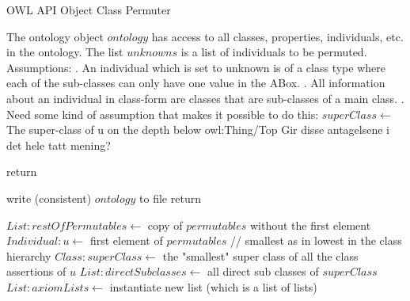 \documentclass{article}
\begin{document}





\begin{algorithm}
\caption{OWL API Object Class Permuter}
\begin{algorithmic}[0]

\State The ontology object $ontology$ has access to all classes, properties, individuals, etc. in the ontology.
\State The list $unknowns$ is a list of individuals to be permuted.
\State
\State Assumptions:
. An individual which is set to unknown is of a class type where each of the sub-classes can only have one value in the ABox.
. All information about an individual in class-form are classes that are sub-classes of a main class.
. Need some kind of assumption that makes it possible to do this: $superClass \leftarrow$ The super-class of u on the depth below owl:Thing/Top
\State Gir disse antagelsene i det hele tatt mening?
\State


		\State return
		\State
	\EndIf	

	
		\State write (consistent) $ontology$ to file
		\State return
		\State
	\EndIf
	
	\State $List:restOfPermutables \leftarrow$ copy of $permutables$ without the first element
	\State $Individual:u \leftarrow$ first element of $permutables$
	\State
	\State // smallest as in lowest in the class hierarchy
	\State $Class:superClass \leftarrow$ the "smallest" super class of all the class assertions of $u$
	\State $List:directSubclasses \leftarrow$ all direct sub classes of $superClass$
	\State $List:axiomLists \leftarrow$ instantiate new list (which is a list of lists)
	\State
	

\end{algorithmic}
\end{algorithm}
\end{document}

